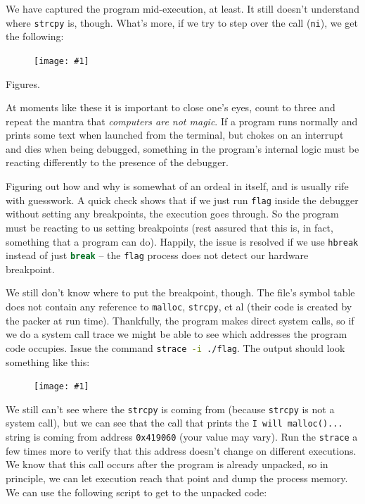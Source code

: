 \documentclass{article}
\newcommand{\displayimage}[1] {
\begin{figure}[H]
    \centering
    \texttt{[image: \#1]} 
\end{figure}
}
\newcommand{\xcode}[2]{\colorbox{ubuntuback}{\lstinline[language=#1]|#2|}}
\newcommand{\code}[1]{\colorbox{ubuntuback}{\texttt{#1}}}
\newcommand{\gdb}[1]{\xcode{C}{#1}}
\begin{document}
We have captured the program mid-execution, at least. It still doesn't understand where \xcode{C}{strcpy} is, though. What's more, if we try to step over the call (\gdb{ni}), we get the following:

\displayimage{./exercises/03_flag/interrupt.png}

Figures.

At moments like these it is important to close one's eyes, count to three and repeat the mantra that \textit{computers are not magic}. If a program runs normally and prints some text when launched from the terminal, but chokes on an interrupt and dies when being debugged, something in the program's internal logic must be reacting differently to the presence of the debugger. 

Figuring out how and why is somewhat of an ordeal in itself, and is usually rife with guesswork. A quick check shows that if we just run \xcode{bash}{flag} inside the debugger without setting any breakpoints, the execution goes through. So the program must be reacting to us setting breakpoints (rest assured that this is, in fact, something that a program can do). Happily, the issue is resolved if we use \gdb{hbreak} instead of just \gdb{break} -- the \xcode{bash}{flag} process does not detect our hardware breakpoint.

We still don't know where to put the breakpoint, though. The file's symbol table does not contain any reference to \xcode{C}{malloc}, \xcode{C}{strcpy}, et al (their code is created by the packer at run time). Thankfully, the program makes direct system calls, so if we do a system call trace we might be able to see which addresses the program code occupies. Issue the command \xcode{bash}{strace -i ./flag}. The output should look something like this:

\displayimage{./exercises/03_flag/strace.png}

We still can't see where the \xcode{C}{strcpy} is coming from (because \xcode{C}{strcpy} is not a system call), but we can see that the call that prints the \code{I will malloc()...} string is coming from address \code{0x419060} (your value may vary). Run the \xcode{bash}{strace} a few times more to verify that this address doesn't change on different executions. We know that this call occurs after the program is already unpacked, so in principle, we can let execution reach that point and dump the process memory. We can use the following script to get to the unpacked code:


\end{document}
